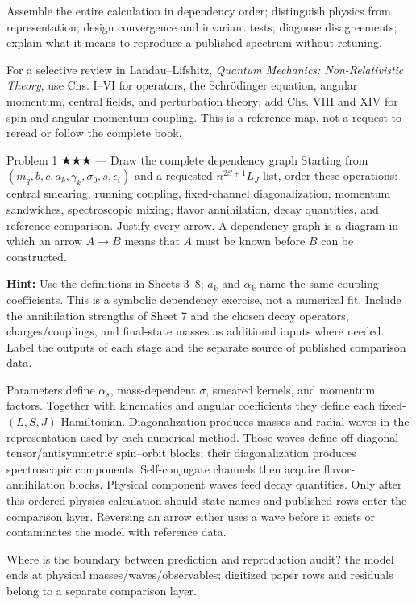 \documentclass[11pt]{article}
\begin{document}

\begin{goals}
Assemble the entire calculation in dependency order; distinguish physics from
representation; design convergence and invariant tests; diagnose disagreements;
explain what it means to reproduce a published spectrum without retuning.
\end{goals}
\begin{reading}
For a selective review in Landau--Lifshitz, \emph{Quantum Mechanics:
Non-Relativistic Theory}, use Chs. I--VI for operators, the Schr\"odinger
equation, angular momentum, central fields, and perturbation theory; add
Chs. VIII and XIV for spin and angular-momentum coupling. This is a reference
map, not a request to reread or follow the complete book.
\end{reading}


\begin{problem}{Problem 1 ★★★ — Draw the complete dependency graph}
Starting from $(m_q,b,c,a_k,\gamma_k,\sigma_0,s,\epsilon_i)$ and a requested
$n^{2S+1}L_J$ list, order these operations: central smearing, running coupling,
fixed-channel diagonalization, momentum sandwiches, spectroscopic mixing,
flavor annihilation, decay quantities, and reference comparison. Justify every
arrow. A dependency graph is a diagram in which an arrow $A\to B$ means that
$A$ must be known before $B$ can be constructed.

\textbf{Hint:} Use the definitions in Sheets 3--8; $a_k$ and $\alpha_k$
name the same coupling coefficients. This is a symbolic dependency exercise,
not a numerical fit. Include the annihilation strengths of Sheet 7 and the
chosen decay operators, charges/couplings, and final-state masses as additional
inputs where needed. Label the outputs of each stage and the separate source
of published comparison data.
\end{problem}
\begin{solution}
Parameters define $\alpha_s$, mass-dependent $\sigma$, smeared kernels, and
momentum factors. Together with kinematics and angular coefficients they define
each fixed-$(L,S,J)$ Hamiltonian. Diagonalization produces masses and radial
waves in the representation used by each numerical method. Those waves define
off-diagonal tensor/antisymmetric spin--orbit blocks;
their diagonalization produces spectroscopic components. Self-conjugate
channels then acquire flavor-annihilation blocks. Physical component waves feed
decay quantities. Only after this ordered physics calculation should state names and
published rows enter the comparison layer. Reversing an arrow either uses a
wave before it exists or contaminates the model with reference data.
\end{solution}
\begin{quiz}
Where is the boundary between prediction and reproduction audit? \answer the
model ends at physical masses/waves/observables; digitized paper rows and
residuals belong to a separate comparison layer.
\end{quiz}
\end{document}
